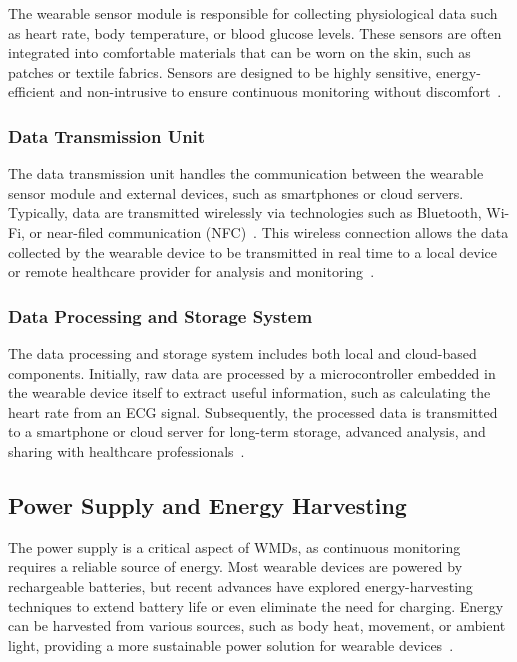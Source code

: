 \documentclass[journal]{IEEEtran}
\begin{document}
        The wearable sensor module is responsible for collecting physiological data such as heart rate, body temperature, or blood glucose levels. These sensors are often integrated into comfortable materials that can be worn on the skin, such as patches or textile fabrics. Sensors are designed to be highly sensitive, energy-efficient and non-intrusive to ensure continuous monitoring without discomfort~\cite{Saifuzzaman2021}.
        
        \subsubsection{Data Transmission Unit}
        
        The data transmission unit handles the communication between the wearable sensor module and external devices, such as smartphones or cloud servers. Typically, data are transmitted wirelessly via technologies such as Bluetooth, Wi-Fi, or near-filed communication (NFC)~\cite{Guk2019}. This wireless connection allows the data collected by the wearable device to be transmitted in real time to a local device or remote healthcare provider for analysis and monitoring~\cite{Nahavandi2022}.

        \subsubsection{Data Processing and Storage System}
        
        The data processing and storage system includes both local and cloud-based components. Initially, raw data are processed by a microcontroller embedded in the wearable device itself to extract useful information, such as calculating the heart rate from an ECG signal. Subsequently, the processed data is transmitted to a smartphone or cloud server for long-term storage, advanced analysis, and sharing with healthcare professionals~\cite{Veeravalli2017}.

    \subsection{Power Supply and Energy Harvesting}
    
    The power supply is a critical aspect of WMDs, as continuous monitoring requires a reliable source of energy. Most wearable devices are powered by rechargeable batteries, but recent advances have explored energy-harvesting techniques to extend battery life or even eliminate the need for charging. Energy can be harvested from various sources, such as body heat, movement, or ambient light, providing a more sustainable power solution for wearable devices~\cite{Ates2022}.
\end{document}

